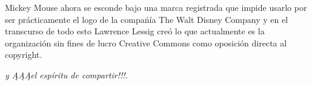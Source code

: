\begin{multicols}{2}
Mickey Mouse ahora se esconde bajo una marca registrada que impide usarlo por ser prácticamente el logo de la compańía The Walt Disney Company y en el transcurso de todo esto Lawrence Lessig creó lo que actualmente es la organización sin fines de lucro Creative Commons como oposición directa al copyright.

\begin{entradilla} %
{\em {\color{introcolor}{Internet}} y ĄĄĄel espíritu de compartir!!!.}
\end{entradilla}
\end{multicols}


\begin{center}
\end{center}

